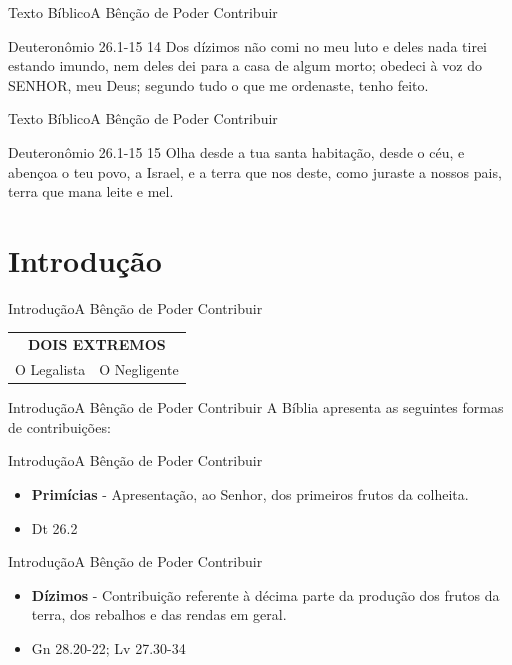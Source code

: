 \documentclass[14pt,aspectratio=169]{beamer}
\newcommand{\TT}{A Bênção de Poder Contribuir}
\newcommand{\TB}{Texto Bíblico}
\newcommand{\DT}{Deuteronômio 26.1-15}
\newcommand{\IN}{Introdução}
\begin{document}
\begin{frame}{\TB}{\TT}
 \begin{block}{\DT}
 \Large
14 Dos dízimos não comi no meu luto e deles nada tirei estando imundo, nem deles dei para a casa de algum morto; obedeci à voz do SENHOR, meu Deus; segundo tudo o que me ordenaste, tenho feito.
 \end{block}
\end{frame}

\begin{frame}{\TB}{\TT}
 \begin{block}{\DT}
15 Olha desde a tua santa habitação, desde o céu, e abençoa o teu povo, a Israel, e a terra que nos deste, como juraste a nossos pais, terra que mana leite e mel. 
 \end{block}
\end{frame}

\begin{frame}
 \tableofcontents
\end{frame}

\section{\IN}
\begin{frame}{\IN}{\TT}
 \begin{table}
  \begin{center}
   \begin{tabular}{lr}
   \multicolumn{2}{c}{\textbf{DOIS EXTREMOS}}\\ \pause
   O Legalista \pause & O Negligente    
   \end{tabular}
  \end{center}
 \end{table}
\end{frame}

\begin{frame}{\IN}{\TT}
 A Bíblia apresenta as seguintes formas de contribuições:
\end{frame}

\begin{frame}{\IN}{\TT}
 \begin{itemize}
  \item \textbf{Primícias} \pause - Apresentação, ao Senhor, dos primeiros frutos da colheita.
  \item[] Dt 26.2
 \end{itemize}
\end{frame}

\begin{frame}{\IN}{\TT}
 \begin{itemize}
  \item \textbf{Dízimos} \pause - Contribuição referente à décima parte da produção dos frutos da terra, dos rebalhos e das rendas em geral.
  \item[] Gn 28.20-22; Lv 27.30-34
 \end{itemize}
\end{frame}
\end{document}
